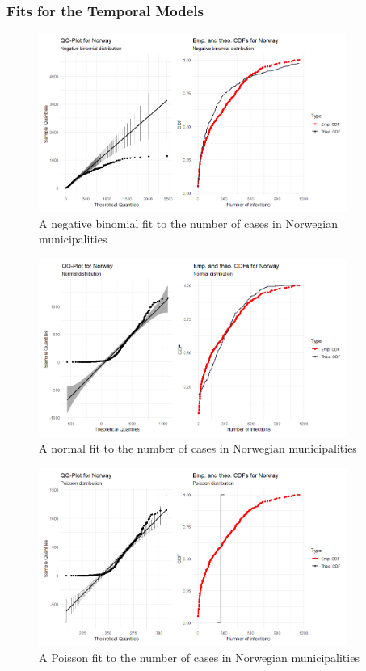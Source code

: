 \subsubsection{Fits for the Temporal Models}
\begin{figure}[H]
  \centering
  \includegraphics[width = 0.9\textwidth]{fit_nbinom_norway_ts.png}
  \caption{A negative binomial fit to the number of cases in Norwegian municipalities}
  \label{fitNegbinomNorway_ts}
\end{figure}
\clearpage
\begin{figure}[H]
  \centering
  \includegraphics[width = 0.9\textwidth]{fit_normal_norway_ts.png}
  \caption{A normal fit to the number of cases in Norwegian municipalities}
  \label{fitNormalNorway_ts}
\end{figure}
\begin{figure}[H]
  \centering
  \includegraphics[width = 0.9\textwidth]{fit_poisson_norway_ts.png}
  \caption{A Poisson fit to the number of cases in Norwegian municipalities}
  \label{fitPoissonNorway_ts}
\end{figure}
